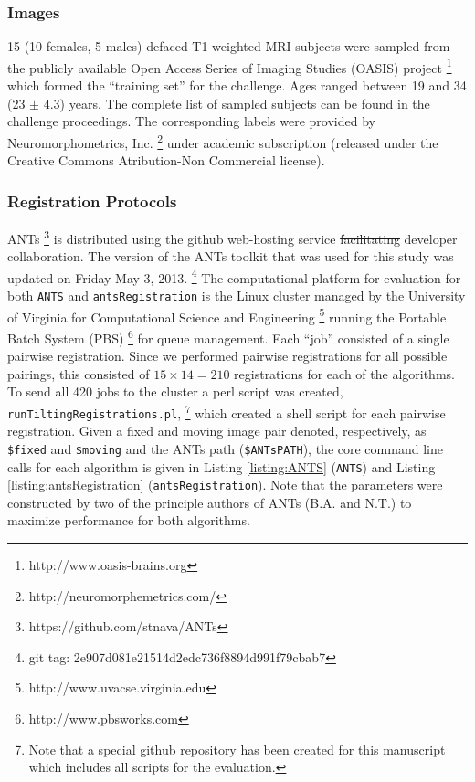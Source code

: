 \documentclass[final,5p,times,twocolumn]{elsarticle}
\newcommand{\trEdit}[1]{{\color{blue}{#1}}}
\newcommand{\trDelete}[1]{{\color{blue}\sout{#1}}}
\begin{document}
\subsubsection{Images}
15 (10 females, 5 males) defaced T1-weighted MRI subjects 
were sampled from the 
publicly available 
Open Access Series of Imaging Studies (OASIS) 
project%
\footnote{
  http://www.oasis-brains.org
} 
which formed the ``training set'' for the challenge.  
Ages ranged between 19 and 34 (23 $\pm$ 4.3) years.
The complete
list of sampled subjects can be found in the challenge proceedings.
The corresponding labels
were provided by Neuromorphometrics, Inc.%
\footnote{
http://neuromorphemetrics.com/
} under academic subscription (released under the Creative Commons 
Atribution-Non Commercial license).

\subsubsection{Registration Protocols}
ANTs%
\footnote{
https://github.com/stnava/ANTs
}
is distributed using the github web-hosting service
\trDelete{facilitating}\trEdit{to facilitate} developer collaboration.  The version
of the ANTs toolkit that was used for this study 
was updated on Friday May 3, 2013.%
\footnote{
git tag: 2e907d081e21514d2edc736f8894d991f79cbab7 
}   
The computational platform for evaluation for both 
\verb#ANTS# and \verb#antsRegistration# is the Linux 
cluster managed by the University of Virginia for 
Computational Science and Engineering%
\footnote{
http://www.uvacse.virginia.edu
}
running the Portable Batch System (PBS)%
\footnote{
http://www.pbsworks.com
}
for queue management.  Each ``job'' consisted of a single
pairwise registration.  Since we performed pairwise registrations
for all possible pairings, this consisted of $15\times14=210$
registrations for each of the algorithms.  To send all 420 
jobs to the cluster
a perl script was created, \verb#runTiltingRegistrations.pl#,%
\footnote{
Note that a special github repository has been created for this
manuscript which includes all scripts for the evaluation.
}
which created a shell script for each pairwise registration.
Given a fixed and moving image pair denoted, respectively, as
\verb#$fixed# and \verb#$moving# and the ANTs path (\verb#$ANTsPATH#), 
the core command line calls
for each algorithm is given in Listing \ref{listing:ANTS} 
(\verb#ANTS#) and Listing \ref{listing:antsRegistration}
(\verb#antsRegistration#).  Note that the parameters were
constructed by two of the principle authors of ANTs 
(B.A. and N.T.) to maximize performance for both algorithms.
\end{document}
